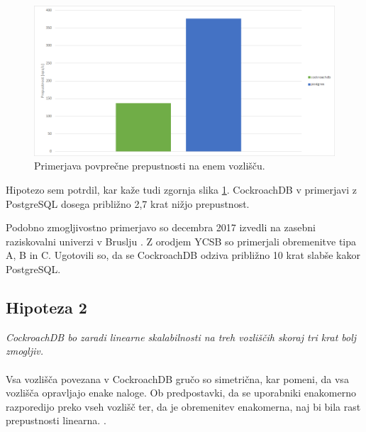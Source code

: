 \documentclass[a4paper, 12pt]{book}
\begin{document}
\begin{figure}[H]
\begin{center}
\includegraphics[width=1\textwidth]{resources/throughput-comparison-n1-v2.png}
\end{center}
\caption{Primerjava povprečne prepustnosti na enem vozlišču.}
\label{img_ycsb_results_throughptu_comparison_n1}
\end{figure}

Hipotezo sem potrdil, kar kaže tudi zgornja slika \ref{img_ycsb_results_throughptu_comparison_n1}. CockroachDB v primerjavi z PostgreSQL dosega približno 2,7 krat nižjo prepustnost.

Podobno zmogljivostno primerjavo so decembra 2017 izvedli na zasebni raziskovalni univerzi v Bruslju \cite{CRDB-2017}. Z orodjem YCSB so primerjali obremenitve tipa A, B in C. Ugotovili so, da se CockroachDB odziva približno 10 krat slabše kakor PostgreSQL.

\subsection{Hipoteza 2}
\textit{CockroachDB bo zaradi linearne skalabilnosti na treh vozliščih skoraj tri krat bolj zmogljiv.}\\\\Vsa vozlišča povezana v CockroachDB gručo so simetrična, kar pomeni, da vsa vozlišča opravljajo enake naloge. Ob predpostavki, da se uporabniki enakomerno razporedijo preko vseh vozlišč ter, da je obremenitev enakomerna, naj bi bila rast prepustnosti linearna. \cite{CRDB-design}.
\end{document}
